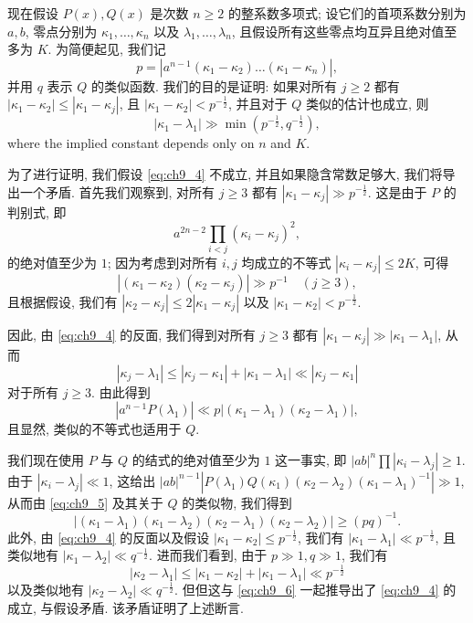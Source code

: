 现在假设 $P(x), Q(x)$ 是次数 $n \ge 2$ 的整系数多项式; 设它们的首项系数分别为 $a, b$, 零点分别为 $\kappa_1, \ldots, \kappa_n$ 以及 $\lambda_1, \ldots, \lambda_n$, 且假设所有这些零点均互异且绝对值至多为 $K$. 为简便起见, 我们记
\[p = |a^{n-1}(\kappa_1 - \kappa_2) \dots (\kappa_1 - \kappa_n)|,\]
并用 $q$ 表示 $Q$ 的类似函数. 我们的目的是证明: 如果对所有 $j \geq 2$ 都有 $|\kappa_1 - \kappa_2| \leq |\kappa_1 - \kappa_j|$, 且 $|\kappa_1 - \kappa_2| < p^{-\frac{1}{2}}$, 并且对于 $Q$ 类似的估计也成立, 则
\[|\kappa_1 - \lambda_1| \gg \min(p^{-\frac{1}{2}}, q^{-\frac{1}{2}}), \tag{4}\label{eq:ch9_4}\]
where the implied constant depends only on $n$ and $K$.

为了进行证明, 我们假设 \eqref{eq:ch9_4} 不成立, 并且如果隐含常数足够大, 我们将导出一个矛盾. 首先我们观察到, 对所有 $j \geqslant 3$ 都有 $|\kappa_1 - \kappa_j| \gg p^{-\frac{1}{2}}$. 这是由于 $P$ 的判别式, 即
\[a^{2n-2}\prod_{i< j}(\kappa_i-\kappa_j)^2,\]
的绝对值至少为 $1$; 因为考虑到对所有 $i, j$ 均成立的不等式 $|\kappa_i - \kappa_j| \le 2K$, 可得
\[\left|(\kappa_1-\kappa_2)(\kappa_2-\kappa_j)\right|\gg p^{-1}\quad (j\geqslant 3),\]
且根据假设, 我们有 $|\kappa_2 - \kappa_j| \leq 2 |\kappa_1 - \kappa_j|$ 以及 $|\kappa_1 - \kappa_2| < p^{-\frac{1}{2}}$.

因此, 由 \eqref{eq:ch9_4} 的反面, 我们得到对所有 $j \ge 3$ 都有 $|\kappa_1 - \kappa_j| \gg |\kappa_1 - \lambda_1|$, 从而
\[|\kappa_j - \lambda_1| \leq |\kappa_j - \kappa_1| + |\kappa_1 - \lambda_1| \ll |\kappa_j - \kappa_1|\]
对于所有 $j \ge 3$. 由此得到
\[\left|a^{n-1}P(\lambda_1)\right| \ll p\left|(\kappa_1 - \lambda_1)(\kappa_2 - \lambda_1)\right|, \tag{5}\label{eq:ch9_5}\]
且显然, 类似的不等式也适用于 $Q$.

我们现在使用 $P$ 与 $Q$ 的结式的绝对值至少为 $1$ 这一事实, 即 $|ab|^n \prod |\kappa_i - \lambda_j| \ge 1$. 由于 $|\kappa_i - \lambda_j| \ll 1$, 这给出 $|ab|^{n-1} |P(\lambda_1) Q(\kappa_1) (\kappa_2 - \lambda_2) (\kappa_1 - \lambda_1)^{-1}| \gg 1$, 从而由 \eqref{eq:ch9_5} 及其关于 $Q$ 的类似物, 我们得到
\[\left| (\kappa_1 - \lambda_1) (\kappa_1 - \lambda_2) (\kappa_2 - \lambda_1) (\kappa_2 - \lambda_2) \right| \geqslant (pq)^{-1}. \tag{6}\label{eq:ch9_6}\]
此外, 由 \eqref{eq:ch9_4} 的反面以及假设 $|\kappa_1 - \kappa_2| \leq p^{-\frac{1}{2}}$, 我们有 $|\kappa_1 - \lambda_1| \ll p^{-\frac{1}{2}}$, 且类似地有 $|\kappa_1 - \lambda_2| \ll q^{-\frac{1}{2}}$. 进而我们看到, 由于 $p \gg 1, q \gg 1$, 我们有
\[|\kappa_2 - \lambda_1| \leq |\kappa_1 - \kappa_2| + |\kappa_1 - \lambda_1| \ll p^{-\frac{1}{2}}\]
以及类似地有 $|\kappa_2 - \lambda_2| \ll q^{-\frac{1}{2}}$. 但但这与 \eqref{eq:ch9_6} 一起推导出了 \eqref{eq:ch9_4} 的成立, 与假设矛盾. 该矛盾证明了上述断言.


